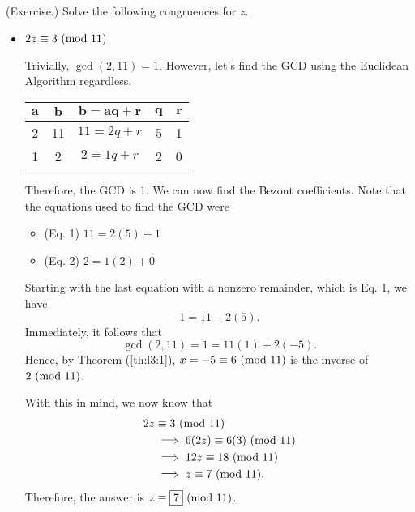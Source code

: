 \documentclass[letterpaper]{article}
\begin{document}
\begin{mdframed}
    (Exercise.) Solve the following congruences for $z$. 
    \begin{itemize}
        \item $2z \equiv 3 \ (\mathrm{mod}\ 11)$
        \begin{mdframed}
            Trivially, $\gcd(2, 11) = 1$. However, let's find the GCD using the Euclidean Algorithm regardless.
            \begin{center}
                \begin{tabular}{|c|c|c|c|c|}
                    \hline 
                    $\mathbf{a}$ & $\mathbf{b}$ & $\mathbf{b = aq + r}$ & $\mathbf{q}$ & $\mathbf{r}$ \\ 
                    \hline 
                    2 & 11 & $11 = 2q + r$ & 5 & 1 \\ 
                    1 & 2 & $2 = 1q + r$ & 2 & 0 \\ 
                    \hline 
                \end{tabular}
            \end{center}
            Therefore, the GCD is 1. We can now find the Bezout coefficients. Note that the equations used to find the GCD were 
            \begin{itemize}
                \item (Eq. 1) $11 = 2(5) + 1$
                \item (Eq. 2) $2 = 1(2) + 0$
            \end{itemize} 
            Starting with the last equation with a nonzero remainder, which is Eq. 1, we have 
            \[1 = 11 - 2(5).\]
            Immediately, it follows that 
            \[\gcd(2, 11) = 1 = 11(1) + 2(-5).\]
            Hence, by Theorem (\ref{th:l3:1}), $x = -5 \equiv 6 \ (\mathrm{mod}\ 11)$ is the inverse of $2 \ (\mathrm{mod}\ 11)$.

            \bigskip 

            With this in mind, we now know that 
            \begin{equation*}
                \begin{aligned}
                    2z &\equiv 3 \ (\mathrm{mod}\ 11) \\ 
                        &\implies 6(2z) \equiv 6(3) \ (\mathrm{mod}\ 11) \\ 
                        &\implies 12z \equiv 18 \ (\mathrm{mod}\ 11) \\ 
                        &\implies z \equiv 7 \ (\mathrm{mod}\ 11).
                \end{aligned}
            \end{equation*}
            Therefore, the answer is $z \equiv \boxed{7} \ (\mathrm{mod}\ 11)$.
        \end{mdframed}
        

\end{itemize}
\end{mdframed}
\end{document}
